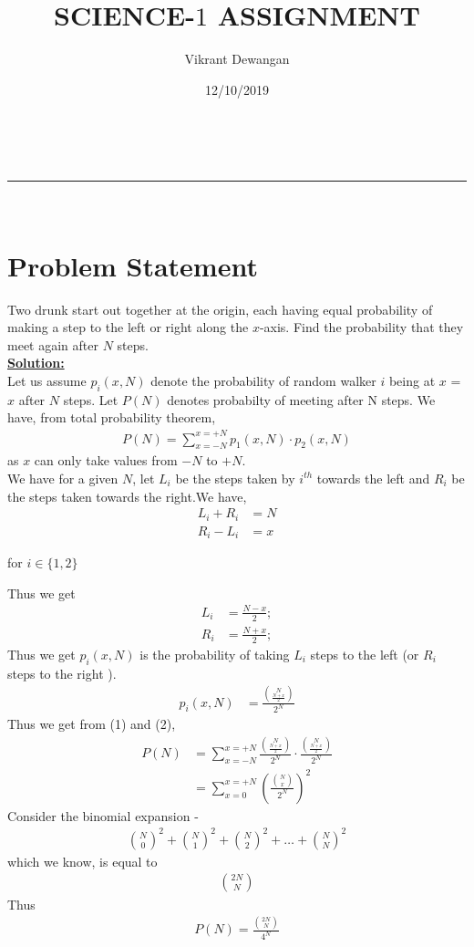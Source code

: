 \documentclass[a4paper,11pt]{article}
\makeatletter
\theoremstyle{definition}
\theoremstyle{plain}
\newcommand{\linia}{\rule{\linewidth}{0.5pt}}
\theoremstyle{mytheor}
\renewcommand{\maketitle}{
	\begin{center}
		\vspace{2ex}
		{\huge \textsc{\@title}}
		\vspace{1ex}
		\\
		\linia\\
		\@author \hfill \@date
		\vspace{4ex}
	\end{center}
}
\makeatother
\begin{document}
	
	\title{SCIENCE-$1$ ASSIGNMENT}
	
	\author{Vikrant Dewangan}
	
	\date{12/10/2019}
	
	\maketitle
	\section*{Problem Statement}
	Two drunk start out together at the origin, each having equal probability of making a step to the left or right along the $x$-axis. Find the probability that they meet again after $N$ steps.\\
	\textbf{\underline{Solution:}}
		\\ Let us assume $p_i(x,N)$ denote the probability of random walker $i$ being at $x$ = $x$ after $N$ steps.
		Let $P(N)$ denotes probabilty of meeting after N steps.
		We have, from total probability theorem,
			\begin{eqnarray}
			P(N) = \sum_{x = -N}^{x = +N} p_1(x,N) \cdot p_2(x,N)
 			\end{eqnarray}
			as $x$ can only take values from $-N$ to $+N$.
		\\
		We have for a given $N$, let $L_i$ be the steps taken by $i^{th}$ towards the left and $R_i$ be the steps taken towards the right.We have,
		\begin{align*}
		L_i + R_i &= N\\
		R_i - L_i &= x
		\end{align*}
		\begin{flushright}
			for $i \in \{1,2\}$	
		\end{flushright}
	Thus we get 
	\begin{align*}
		L_i &= \frac{N-x}{2};\\
		R_i &= \frac{N+x}{2};
	\end{align*}
		Thus we get $p_i(x,N)$ is the probability of taking $L_i$ steps to the left (or $R_i$ steps to the right ).
		\begin{align}
			p_i(x,N) &= \frac{{N\choose \frac{N+x}{2}}}{2^N}
		\end{align}
		Thus we get from (1) and (2),
		\begin{align*}
		P(N) &= \sum_{x=-N}^{x=+N}\frac{{N\choose \frac{N+x}{2}}}{2^N} \cdot \frac{{N\choose \frac{N+x}{2}}}{2^N}\\
		&= \sum_{x=0}^{x=+N}\left(\frac{{N\choose x}}{2^N}\right)^2
		\end{align*}	
		Consider the binomial expansion - 
		\begin{align}
		{N\choose 0}^2 + {N\choose 1}^2 + {N\choose 2}^2 + \ldots + {N\choose N}^2
		\end{align}
		which we know, is equal to 
		\begin{align}
		{2N\choose N}
		\end{align}
		Thus 
		\begin{eqnarray}
		P(N) = \frac{{2N\choose N}}{4^N}
		\end{eqnarray}
	
\end{document}
